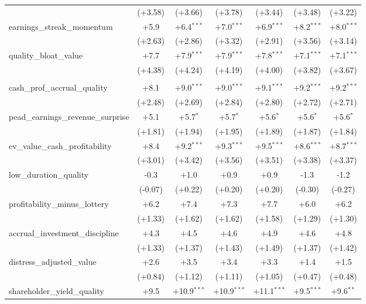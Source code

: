 \begin{table}[htbp]
\begin{threeparttable}
\begin{tabular}{lcccccc}
 & (+3.58) & (+3.66) & (+3.78) & (+3.44) & (+3.48) & (+3.22) \\
\addlinespace
earnings\_streak\_momentum & +5.9 & +6.4$^{***}$ & +7.0$^{***}$ & +6.9$^{***}$ & +8.2$^{***}$ & +8.0$^{***}$ \\
 & (+2.63) & (+2.86) & (+3.32) & (+2.91) & (+3.56) & (+3.14) \\
\addlinespace
quality\_bloat\_value & +7.7 & +7.9$^{***}$ & +7.9$^{***}$ & +7.8$^{***}$ & +7.1$^{***}$ & +7.1$^{***}$ \\
 & (+4.38) & (+4.24) & (+4.19) & (+4.00) & (+3.82) & (+3.67) \\
\addlinespace
\midrule
\multicolumn{7}{l}{\textit{Panel B: Out-of-sample (post-2000-12-31)}} \\
\addlinespace
cash\_prof\_accrual\_quality & +8.1 & +9.0$^{***}$ & +9.0$^{***}$ & +9.1$^{***}$ & +9.2$^{***}$ & +9.2$^{***}$ \\
 & (+2.48) & (+2.69) & (+2.84) & (+2.80) & (+2.72) & (+2.71) \\
\addlinespace
pead\_earnings\_revenue\_surprise & +5.1 & +5.7$^{*}$ & +5.7$^{*}$ & +5.6$^{*}$ & +5.6$^{*}$ & +5.6$^{*}$ \\
 & (+1.81) & (+1.94) & (+1.95) & (+1.89) & (+1.87) & (+1.84) \\
\addlinespace
ev\_value\_cash\_profitability & +8.4 & +9.2$^{***}$ & +9.3$^{***}$ & +9.5$^{***}$ & +8.6$^{***}$ & +8.7$^{***}$ \\
 & (+3.01) & (+3.42) & (+3.56) & (+3.51) & (+3.38) & (+3.37) \\
\addlinespace
low\_duration\_quality & -0.3 & +1.0 & +0.9 & +0.9 & -1.3 & -1.2 \\
 & (-0.07) & (+0.22) & (+0.20) & (+0.20) & (-0.30) & (-0.27) \\
\addlinespace
profitability\_minus\_lottery & +6.2 & +7.4 & +7.3 & +7.7 & +6.0 & +6.2 \\
 & (+1.33) & (+1.62) & (+1.62) & (+1.58) & (+1.29) & (+1.30) \\
\addlinespace
accrual\_investment\_discipline & +4.3 & +4.5 & +4.6 & +4.9 & +4.6 & +4.8 \\
 & (+1.33) & (+1.37) & (+1.43) & (+1.49) & (+1.37) & (+1.42) \\
\addlinespace
distress\_adjusted\_value & +2.6 & +3.5 & +3.4 & +3.3 & +1.4 & +1.5 \\
 & (+0.84) & (+1.12) & (+1.11) & (+1.05) & (+0.47) & (+0.48) \\
\addlinespace
shareholder\_yield\_quality & +9.5 & +10.9$^{***}$ & +10.9$^{***}$ & +11.1$^{***}$ & +9.5$^{***}$ & +9.6$^{**}$ \\

\end{tabular}
\end{threeparttable}
\end{table}
